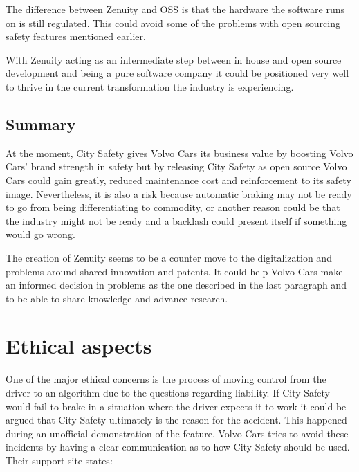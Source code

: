 \documentclass[conference]{IEEEtran}
\begin{document}
The difference between Zenuity and OSS is that the hardware the software runs on is still regulated. This could avoid some of the problems with open sourcing safety features mentioned earlier.

With Zenuity acting as an intermediate step between in house and open source development and being a pure software company it could be positioned very well to thrive in the current transformation the industry is experiencing.

\subsection{Summary}
At the moment, City Safety gives Volvo Cars its business value by boosting Volvo Cars' brand strength in safety but by releasing City Safety as open source Volvo Cars could gain greatly, reduced maintenance cost and reinforcement to its safety image. Nevertheless, it is also a risk because automatic braking may not be ready to go from being differentiating to commodity, or another reason could be that the industry might not be ready and a backlash could present itself if something would go wrong.

The creation of Zenuity seems to be a counter move to the digitalization and problems around shared innovation and patents. It could help Volvo Cars make an informed decision in problems as the one described in the last paragraph and to be able to share knowledge and advance research.



\section{Ethical aspects}
One of the major ethical concerns is the process of moving control from the driver to an algorithm due to the questions regarding liability. If City Safety would fail to brake in a situation where the driver expects it to work it could be argued that City Safety ultimately is the reason for the accident. This happened during an unofficial demonstration of the feature. \cite{CitySafetyFail} Volvo Cars tries to avoid these incidents by having a clear communication as to how City Safety should be used. Their support site states:
\end{document}

